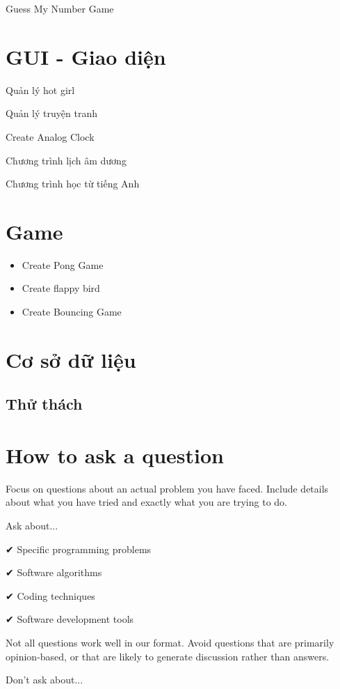 Guess My Number Game

\section{GUI - Giao diện}

Quản lý hot girl

Quản lý truyện tranh

Create Analog Clock

Chương trình lịch âm dương

Chương trình học từ tiếng Anh

\section{Game}

\begin{itemize}
  \item Create Pong Game
  \item Create flappy bird
  \item Create Bouncing Game
\end{itemize}


\section{Cơ sở dữ liệu}

\subsection{Thử thách}


\section{How to ask a question}

Focus on questions about an actual problem you have faced. Include details about what you have tried and exactly what you are trying to do.

Ask about...

✔ Specific programming problems

✔ Software algorithms

✔ Coding techniques

✔ Software development tools

Not all questions work well in our format. Avoid questions that are primarily opinion-based, or that are likely to generate discussion rather than answers.

Don't ask about...

